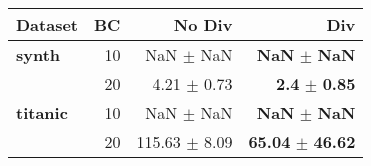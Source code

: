 \begin{tabular}{l|r|r|r}
\textbf{Dataset} & \textbf{BC} & \textbf{No Div} & \textbf{Div} \\
\hline
\textbf{synth} & 10 & NaN $\pm$ NaN & \textbf{NaN} $\pm$ \textbf{NaN} \\
& 20 & 4.21 $\pm$ 0.73 & \textbf{2.4} $\pm$ \textbf{0.85} \\
\hline
\textbf{titanic} & 10 & NaN $\pm$ NaN & \textbf{NaN} $\pm$ \textbf{NaN} \\
& 20 & 115.63 $\pm$ 8.09 & \textbf{65.04} $\pm$ \textbf{46.62} \\
\hline
\end{tabular}
